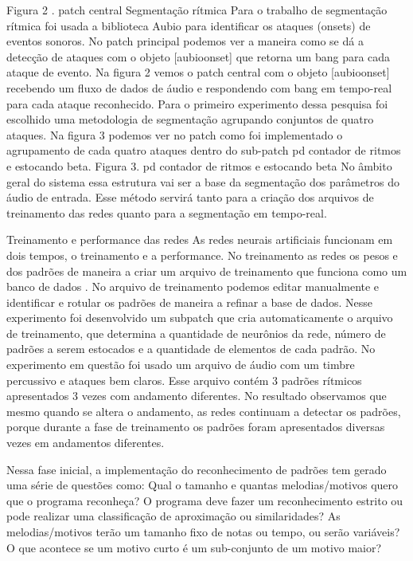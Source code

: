 \documentclass{ppgmus}
\begin{document}
Figura 2 . patch central
 Segmentação rítmica
Para o trabalho de segmentação rítmica foi usada a biblioteca Aubio para identificar os ataques (onsets) de eventos 
sonoros. No patch principal podemos ver a maneira como se dá a detecção de ataques com o objeto [aubioonset\texttildelow] que retorna 
um bang para cada ataque de evento. Na figura 2 vemos o patch central com o objeto  [aubioonset\texttildelow] recebendo um fluxo de 
dados de áudio e respondendo com bang em tempo-real para cada ataque reconhecido.
   Para o primeiro experimento dessa pesquisa foi escolhido uma
metodologia de segmentação agrupando conjuntos de quatro ataques. Na figura 3 podemos ver no patch como foi implementado 
o agrupamento de cada quatro  ataques dentro do sub-patch pd contador de ritmos e estocando beta.
Figura 3. pd contador de ritmos e estocando beta
No âmbito geral do sistema essa estrutura vai ser a base da segmentação dos parâmetros do áudio de entrada. Esse método 
servirá tanto para  a criação dos arquivos de treinamento das redes quanto para a segmentação em tempo-real.

 Treinamento e performance das redes
As redes neurais artificiais funcionam em dois tempos, o treinamento e a performance. No treinamento as redes os pesos e 
dos padrões de maneira a criar um arquivo de treinamento que funciona como um banco de dados . No arquivo de treinamento 
podemos editar manualmente e identificar e rotular os padrões de maneira a refinar a base de dados. Nesse experimento foi 
desenvolvido um subpatch que cria automaticamente o arquivo de treinamento, que determina a quantidade de neurônios da 
rede, número de padrões a serem estocados e a quantidade de elementos de cada padrão.
   No experimento em questão foi usado um arquivo de áudio com um timbre percussivo e ataques bem claros. Esse arquivo 
contém 3 padrões rítmicos apresentados 3 vezes com  andamento diferentes. No resultado observamos que mesmo quando se 
altera o andamento, as redes continuam a detectar os padrões, porque durante a fase de treinamento os padrões foram 
apresentados diversas vezes em andamentos diferentes.

Nessa fase inicial, a implementação do reconhecimento de padrões tem gerado uma série de 
questões como: Qual o tamanho e quantas melodias/motivos quero que o programa reconheça? O programa 
deve fazer um reconhecimento estrito ou pode realizar uma classificação de aproximação ou 
similaridades? As melodias/motivos terão um tamanho fixo de notas ou tempo, ou serão variáveis? 
O que acontece se um motivo curto é um sub-conjunto de um motivo maior?
\end{document}
